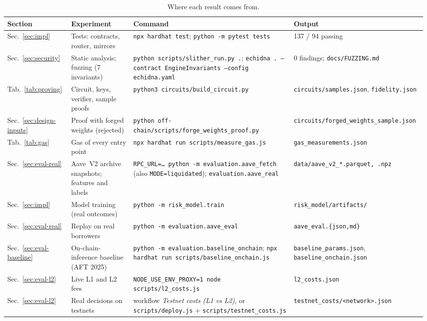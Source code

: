 \documentclass[sigconf,nonacm]{acmart}
\newcommand{\code}[1]{\texttt{\smaller #1}}
\begin{document}
\begin{table}[t]
  \caption{Where each result comes from.}
  \label{tab:repro}
  \footnotesize
  \setlength{\tabcolsep}{3pt}
  \begin{tabularx}{\textwidth}{@{}p{1.9cm}P{4.0cm}LP{3.9cm}@{}}
    \toprule
    \textbf{Section} & \textbf{Experiment} & \textbf{Command} & \textbf{Output} \\
    \midrule
    Sec.~\ref{sec:impl} & Tests: contracts, router, mirrors & \code{npx hardhat test}; \code{python -m pytest tests} & 137 / 94 passing \\
    Sec.~\ref{sec:security} & Static analysis; fuzzing (7 invariants) & \code{python scripts/slither\_run.py .}; \code{echidna . --contract EngineInvariants --config echidna.yaml} & 0 findings; \code{docs/FUZZING.md} \\
    Tab.~\ref{tab:proving} & Circuit, keys, verifier, sample proofs & \code{python3 circuits/build\_circuit.py} & \code{circuits/samples.json}, \code{fidelity.json} \\
    Sec.~\ref{sec:design-inputs} & Proof with forged weights (rejected) & \code{python off-chain/scripts/forge\_weights\_proof.py} & \code{circuits/forged\_weights\_sample.json} \\
    Tab.~\ref{tab:gas} & Gas of every entry point & \code{npx hardhat run scripts/measure\_gas.js} & \code{gas\_measurements.json} \\
    Sec.~\ref{sec:eval-real} & Aave~V2 archive snapshots; features and labels & \code{RPC\_URL=\dots{} python -m evaluation.aave\_fetch} (also \code{MODE=liquidated}); \code{evaluation.aave\_real} & \code{data/aave\_v2\_*.parquet, .npz} \\
    Sec.~\ref{sec:impl} & Model training (real outcomes) & \code{python -m risk\_model.train} & \code{risk\_model/artifacts/} \\
    Sec.~\ref{sec:eval-real} & Replay on real borrowers & \code{python -m evaluation.aave\_eval} & \code{aave\_eval.\{json,md\}} \\
    Sec.~\ref{sec:eval-baseline} & On-chain-inference baseline (AFT 2025) & \code{python -m evaluation.baseline\_onchain}; \code{npx hardhat run scripts/baseline\_onchain.js} & \code{baseline\_params.json}, \code{baseline\_onchain.json} \\
    Sec.~\ref{sec:eval-l2} & Live L1 and L2 fees & \code{NODE\_USE\_ENV\_PROXY=1 node scripts/l2\_costs.js} & \code{l2\_costs.json} \\
    Sec.~\ref{sec:eval-l2} & Real decisions on testnets & workflow \emph{Testnet costs (L1 vs L2)}, or \code{scripts/deploy.js} + \code{scripts/testnet\_costs.js} & \code{testnet\_costs/<network>.json} \\

\end{tabularx}
\end{table}
\end{document}
